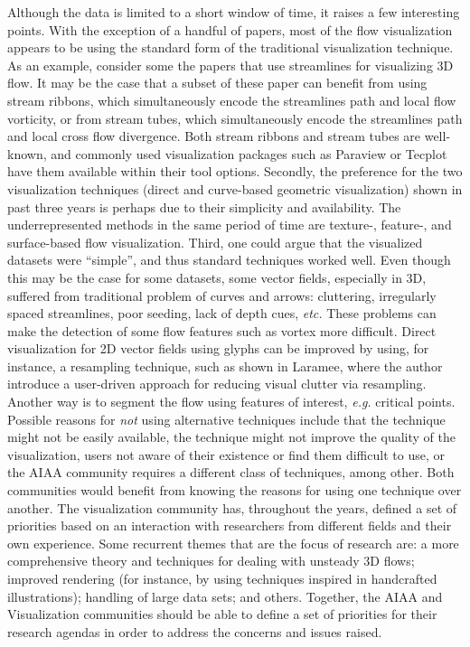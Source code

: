 Although the data is limited to a short window of time, it raises a few interesting points. 
%
With the exception of a handful of papers, most of the flow visualization appears to be using the standard form of the traditional visualization technique.
%
As an example, consider some the papers that use streamlines for visualizing 3D flow. 
%
It may be the case that a subset of these paper can benefit from using stream ribbons\cite{Ueng:1996:ESS:614262.614333}, which simultaneously encode the streamlines path and local flow vorticity,
%
or from stream tubes\cite{Ueng:1996:ESS:614262.614333}, which simultaneously encode the streamlines path and local cross flow divergence. 
%
Both stream ribbons and stream tubes are well-known, and commonly used visualization packages such as Paraview or Tecplot have them available within their tool options.
%
%
%
%
Secondly, the preference for the two visualization techniques (direct and curve-based geometric visualization) shown in past three years is perhaps due to their simplicity and availability. 
%
The underrepresented methods in the same period of time are texture-, feature-, and surface-based flow visualization.
%
%
%
%
%
Third, one could argue that the visualized datasets were ``simple'', and thus standard techniques worked well. 
%
Even though this may be the case for some datasets, some vector fields, especially in 3D, suffered from traditional problem of curves and arrows:
%
cluttering, irregularly spaced streamlines, poor seeding, lack of depth cues,  {\em etc.} 
%
These problems can make the detection of some flow features such as vortex more difficult. 
%
Direct visualization for 2D vector fields using glyphs can be improved by using, for instance, a resampling technique, such as shown in Laramee\cite{Laramee2003905}, where the author introduce a user-driven approach for reducing visual clutter via resampling. 
%
Another way is to segment the flow using features of interest, \emph{e.g.} critical points.
%
%
%
%
%
%
%
Possible reasons for \emph{not} using alternative techniques include that the technique might not be easily available, the technique might not improve the quality of the visualization, users not aware of their existence or find them difficult to use, or the AIAA community 
requires a different class of techniques, among other.
%
%
Both communities would benefit from knowing the reasons for using one technique over another.  
%
The visualization community has, throughout the years, defined a set of priorities based on an interaction with researchers from different fields and their own experience.
%
Some recurrent themes that are the focus of research are: 
%
a more comprehensive theory and techniques for dealing with unsteady 3D flows; 
%
improved rendering (for instance, by using techniques inspired in handcrafted illustrations\cite{Brambilla12Illustrative});
%
handling of large data sets; and others.
%
Together, the AIAA and Visualization communities should be 
able to define a set of priorities for their research agendas 
in order to address the concerns and issues raised.



